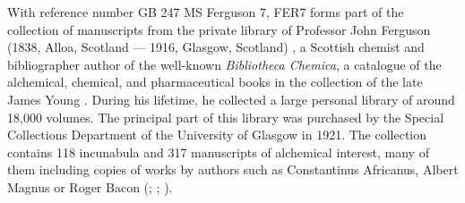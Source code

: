 \documentclass{article}
\begin{document}
With reference number GB 247 MS Ferguson 7, FER7 forms part of the
collection of manuscripts from the private library of Professor John
Ferguson (1838, Alloa, Scotland –– 1916, Glasgow, Scotland) \citep[1--3]{weston_ferguson_2004}, a Scottish chemist and bibliographer author of the
well-known \emph{Bibliotheca Chemica}, a catalogue of the
alchemical, chemical, and pharmaceutical books in the collection of the
late James Young \citep{ferguson_bibliotheca_1906}. During his lifetime, he collected a large personal
library of around 18,000 volumes. The principal part of this library was purchased
by the Special Collections Department of the University of Glasgow in
1921. The collection contains 118 incunabula and 317 manuscripts of
alchemical interest, many of them including copies of works by authors
such as Constantinus Africanus, Albert Magnus or Roger Bacon (\cite{noauthor_biography_nodate}; \cite[3]{weston_ferguson_2004}; \cite{noauthor_ferguson_nodate}).
\end{document}
